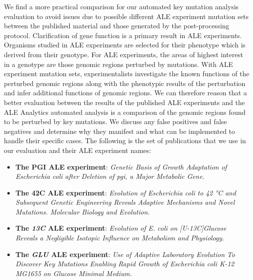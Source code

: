 \documentclass[12pt,final,masters,chapterheads]{ucsd}  %
\begin{document}
%
%
We find a more practical comparison for our automated key mutation analysis evaluation to avoid issues due to possible different ALE experiment mutation sets between the published material and those generated by the post-processing protocol. Clarification of gene function is a primary result in ALE experiments. Organisms studied in ALE experiments are selected for their phenotype which is derived from their genotype. For ALE experiments, the areas of highest interest in a genotype are those genomic regions perturbed by mutations. With ALE experiment mutation sets, experimentalists investigate the known functions of the perturbed genomic regions along with the phenotypic results of the perturbation and infer additional functions of genomic regions. We can therefore reason that a better evaluation between the results of the published ALE experiments and the ALE Analytics automated analysis is a comparison of the genomic regions found to be perturbed by key mutations. We discuss any false positives and false negatives and determine why they manifest and what can be implemented to handle their specific cases. The following is the set of publications that we use in our evaluation and their ALE experiment names:
\begin{itemize}
\item \textbf{The PGI ALE experiment}: \textit{Genetic Basis of Growth Adaptation of Escherichia coli after Deletion of pgi, a Major Metabolic Gene.} \cite{10.1371/journal.pgen.1001186}
\item \textbf{The 42C ALE experiment}: \textit{Evolution of Escherichia coli to 42 °C and Subsequent Genetic Engineering Reveals Adaptive Mechanisms and Novel Mutations. Molecular Biology and Evolution.} \cite{pmid25015645}
\item \textbf{The \textit{13C }ALE experiment}: \textit{Evolution of E. coli on [U-13C]Glucose Reveals a Negligible Isotopic Influence on Metabolism and Physiology.} \cite{pmid26964043}
\item \textbf{The \textit{GLU }ALE experiment}: \textit{Use of Adaptive Laboratory Evolution To Discover Key Mutations Enabling Rapid Growth of Escherichia coli K-12 MG1655 on Glucose Minimal Medium.} \cite{pmid25304508}
\end{itemize}
\end{document}
